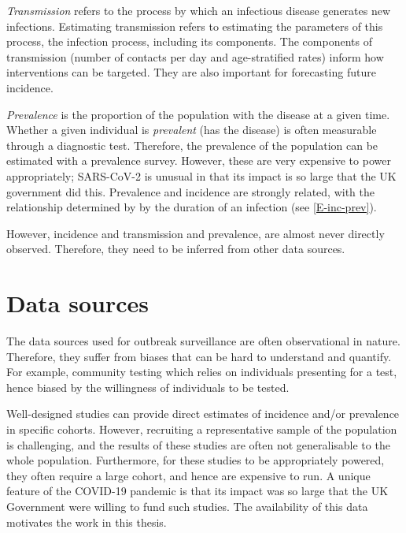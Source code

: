 \documentclass[thesis.tex]{subfiles}
\begin{document}
\emph{Transmission} refers to the process by which an infectious disease generates new infections.
Estimating transmission refers to estimating the parameters of this process, the infection process, including its components.
The components of transmission (\eg number of contacts per day and age-stratified rates) inform how interventions can be targeted.
They are also important for forecasting future incidence.

\emph{Prevalence} is the proportion of the population with the disease at a given time.
Whether a given individual is \emph{prevalent} (has the disease) is often measurable through a diagnostic test.
Therefore, the prevalence of the population can be estimated with a prevalence survey.
However, these are very expensive to power appropriately; SARS-CoV-2 is unusual in that its impact is so large that the UK government did this.
Prevalence and incidence are strongly related, with the relationship determined by by the duration of an infection (see \cref{E-inc-prev}).


However, incidence and transmission and prevalence, are almost never directly observed.
Therefore, they need to be inferred from other data sources.


\section{Data sources}


The data sources used for outbreak surveillance are often observational in nature.
Therefore, they suffer from biases that can be hard to understand and quantify.
For example, community testing which relies on individuals presenting for a test, hence biased by the willingness of individuals to be tested.

Well-designed studies can provide direct estimates of incidence and/or prevalence in specific cohorts.
However, recruiting a representative sample of the population is challenging, and the results of these studies are often not generalisable to the whole population.
Furthermore, for these studies to be appropriately powered, they often require a large cohort, and hence are expensive to run.
A unique feature of the COVID-19 pandemic is that its impact was so large that the UK Government were willing to fund such studies.
The availability of this data motivates the work in this thesis.
\end{document}

